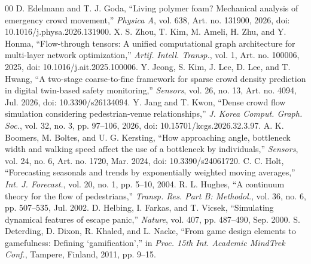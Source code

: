 \documentclass[conference,a4paper]{IEEEtran}
\begin{document}
\begin{thebibliography}{00}
 D. Edelmann and T. J. Goda, ``Living polymer foam? Mechanical analysis of emergency crowd movement,'' \emph{Physica A}, vol. 638, Art. no. 131900, 2026, doi: 10.1016/j.physa.2026.131900.
 X. S. Zhou, T. Kim, M. Ameli, H. Zhu, and Y. Honma, ``Flow-through tensors: A unified computational graph architecture for multi-layer network optimization,'' \emph{Artif. Intell. Transp.}, vol. 1, Art. no. 100006, 2025, doi: 10.1016/j.ait.2025.100006.
 Y. Jeong, S. Kim, J. Lee, D. Lee, and T. Hwang, ``A two-stage coarse-to-fine framework for sparse crowd density prediction in digital twin-based safety monitoring,'' \emph{Sensors}, vol. 26, no. 13, Art. no. 4094, Jul. 2026, doi: 10.3390/s26134094.
 Y. Jang and T. Kwon, ``Dense crowd flow simulation considering pedestrian-venue relationships,'' \emph{J. Korea Comput. Graph. Soc.}, vol. 32, no. 3, pp. 97--106, 2026, doi: 10.15701/kcgs.2026.32.3.97.
 A. K. Boomers, M. Boltes, and U. G. Kersting, ``How approaching angle, bottleneck width and walking speed affect the use of a bottleneck by individuals,'' \emph{Sensors}, vol. 24, no. 6, Art. no. 1720, Mar. 2024, doi: 10.3390/s24061720.
 C. C. Holt, ``Forecasting seasonals and trends by exponentially weighted moving averages,'' \emph{Int. J. Forecast.}, vol. 20, no. 1, pp. 5--10, 2004.
 R. L. Hughes, ``A continuum theory for the flow of pedestrians,'' \emph{Transp. Res. Part B: Methodol.}, vol. 36, no. 6, pp. 507--535, Jul. 2002.
 D. Helbing, I. Farkas, and T. Vicsek, ``Simulating dynamical features of escape panic,'' \emph{Nature}, vol. 407, pp. 487--490, Sep. 2000.
 S. Deterding, D. Dixon, R. Khaled, and L. Nacke, ``From game design elements to gamefulness: Defining `gamification','' in \emph{Proc. 15th Int. Academic MindTrek Conf.}, Tampere, Finland, 2011, pp. 9--15.
\end{thebibliography}
\end{document}
